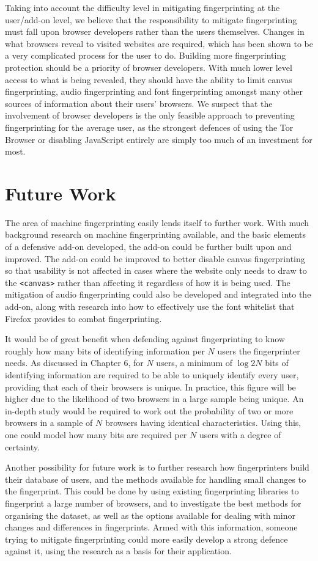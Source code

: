 Taking into account the difficulty level in mitigating fingerprinting at the user/add-on level, we believe that the responsibility to mitigate fingerprinting must fall upon browser developers rather than the users themselves.
Changes in what browsers reveal to visited websites are required, which has been shown to be a very complicated process for the user to do.
Building more fingerprinting protection should be a priority of browser developers.
With much lower level access to what is being revealed, they should have the ability to limit canvas fingerprinting, audio fingerprinting and font fingerprinting amongst many other sources of information about their users' browsers.
We suspect that the involvement of browser developers is the only feasible approach to preventing fingerprinting for the average user, as the strongest defences of using the Tor Browser or disabling JavaScript entirely are simply too much of an investment for most.

\section{Future Work}

The area of machine fingerprinting easily lends itself to further work.
With much background research on machine fingerprinting available, and the basic elements of a defensive add-on developed, the add-on could be further built upon and improved.
The add-on could be improved to better disable canvas fingerprinting so that usability is not affected in cases where the website only needs to draw to the \texttt{<canvas>} rather than affecting it regardless of how it is being used.
The mitigation of audio fingerprinting could also be developed and integrated into the add-on, along with research into how to effectively use the font whitelist that Firefox provides to combat fingerprinting.

It would be of great benefit when defending against fingerprinting to know roughly how many bits of identifying information per $N$ users the fingerprinter needs.
As discussed in Chapter 6, for $N$ users, a minimum of $\log{2}N$ bits of identifying information are required to be able to uniquely identify every user, providing that each of their browsers is unique.
In practice, this figure will be higher due to the likelihood of two browsers in a large sample being unique.
An in-depth study would be required to work out the probability of two or more browsers in a sample of $N$ browsers having identical characteristics.
Using this, one could model how many bits are required per $N$ users with a degree of certainty.

Another possibility for future work is to further research how fingerprinters build their database of users, and the methods available for handling small changes to the fingerprint.
This could be done by using existing fingerprinting libraries to fingerprint a large number of browsers, and to investigate the best methods for organising the dataset, as well as the options available for dealing with minor changes and differences in fingerprints.
Armed with this information, someone trying to mitigate fingerprinting could more easily develop a strong defence against it, using the research as a basis for their application.

